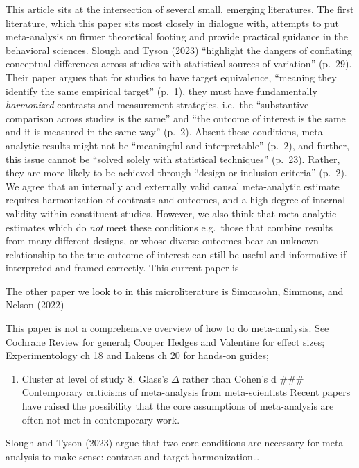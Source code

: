 \documentclass[
  man]{apa6}
\providecommand{\tightlist}{%
  \setlength{\itemsep}{0pt}\setlength{\parskip}{0pt}}
\begin{document}
This article sits at the intersection of several small, emerging literatures. The first literature, which this paper sits most closely in dialogue with, attempts to put meta-analysis on firmer theoretical footing and provide practical guidance in the behavioral sciences. Slough and Tyson (2023) ``highlight the dangers of conflating conceptual differences across studies with statistical sources of variation'' (p.~29). Their paper argues that for studies to have target equivalence, ``meaning they identify the same empirical target'' (p.~1), they must have fundamentally \emph{harmonized} contrasts and measurement strategies, i.e.~the ``substantive comparison across studies is the same'' and ``the outcome of interest is the same and it is measured in the same way'' (p.~2). Absent these conditions, meta-analytic results might not be ``meaningful and interpretable'' (p.~2), and further, this issue cannot be ``solved solely with statistical techniques'' (p.~23). Rather, they are more likely to be achieved through ``design or inclusion criteria'' (p.~2). We agree that an internally and externally valid causal meta-analytic estimate requires harmonization of contrasts and outcomes, and a high degree of internal validity within constituent studies. However, we also think that meta-analytic estimates which do \emph{not} meet these conditions \textemdash e.g.~those that combine results from many different designs, or whose diverse outcomes bear an unknown relationship to the true outcome of interest \textemdash can still be useful and informative if interpreted and framed correctly. This current paper is

The other paper we look to in this microliterature is Simonsohn, Simmons, and Nelson (2022)

This paper is not a comprehensive overview of how to do meta-analysis. See Cochrane Review for general; Cooper Hedges and Valentine for effect sizes; Experimentology ch 18 and Lakens ch 20 for hands-on guides;

\begin{enumerate}
\def\labelenumi{\arabic{enumi}.}
\setcounter{enumi}{6}
\tightlist
\item
  Cluster at level of study
  8. Glass's \(\Delta\) rather than Cohen's d
  \#\#\# Contemporary criticisms of meta-analysis from meta-scientists
  Recent papers have raised the possibility that the core assumptions of meta-analysis are often not met in contemporary work.
\end{enumerate}

Slough and Tyson (2023) argue that two core conditions are necessary for meta-analysis to make sense: contrast and target harmonization\ldots{}
\end{document}
